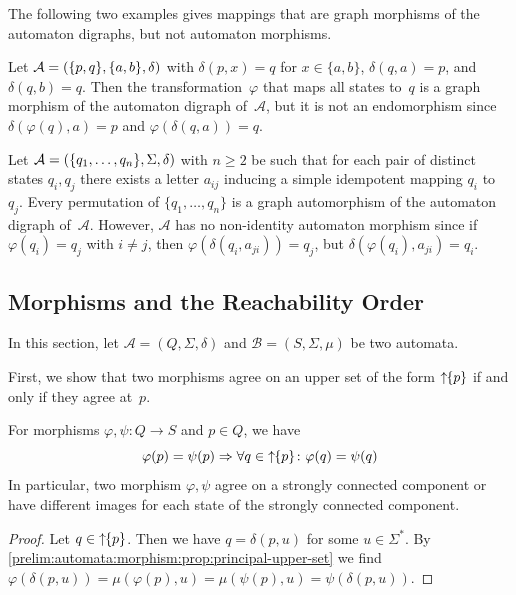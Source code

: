 The following two examples gives mappings that are graph morphisms of the automaton digraphs,
but not automaton morphisms.

\begin{example}
Let $\mathcal A = (\{p,q\}, \{a,b\}, \delta)$
with $\delta(p, x) = q$ for $x \in \{a,b\}$, $\delta(q, a) = p$, and $\delta(q, b) = q$.
Then the transformation~$\varphi$ that maps all states to~$q$
is a graph morphism of the automaton digraph of~$\mathcal A$,
but it is not an endomorphism
since $\delta(\varphi(q), a) = p$ and $\varphi(\delta(q, a)) = q$.
\end{example}

\begin{example}
Let $\mathcal A = (\{q_1,\ldots, q_n\}, \Sigma, \delta)$ with $n \ge 2$
be such that for each pair of distinct states $q_i, q_j$ there exists 
a letter $a_{ij}$ inducing a simple idempotent mapping $q_i$ to~$q_j$.
Every permutation of $\{q_1, \ldots, q_n\}$
is a graph automorphism of the automaton digraph of~$\mathcal A$.
However, $\mathcal A$ has no non-identity
automaton morphism
since if $\varphi(q_i) = q_j$ with $i \ne j$,
then $\varphi(\delta(q_i, a_{ji})) = q_j$,
but $\delta(\varphi(q_i), a_{ji}) = q_i$.
\end{example}



\subsection{Morphisms and the Reachability Order}

In this section, let $\mathcal A = (Q, \Sigma, \delta)$ and $\mathcal B = (S, \Sigma, \mu)$
be two automata.

First, we show that two morphisms agree on an upper set of the form $\mbox{\ensuremath{\displaystyle \uparrow \!\!\{p\}}}$
if and only if they agree at~$p$.

\begin{proposition} \label{prelim:automata:morphism:cor:two-morp-upper-set}
For morphisms $\varphi, \psi \colon Q \to S$ and $p \in Q$, we have
  \begin{equation}
	\varphi(p) = \psi(p) \Rightarrow \forall q \in \mbox{\ensuremath{\displaystyle \uparrow \!\!\{p\}}} \colon \varphi(q) = \psi(q) \label{prelim:eqn:two-morph-equal} 
  \end{equation}
 In particular, two morphism $\varphi, \psi$ agree on a strongly connected component
 or have different images for each state of the strongly connected component.
\end{proposition}
\begin{proof}
	Let $q \in \mbox{\ensuremath{\displaystyle \uparrow \!\!\{p\}}}$.
	Then we have $q = \delta(p, u)$ for some $u \in \Sigma^*$.
	By \cref{prelim:automata:morphism:prop:principal-upper-set}
	we find $\varphi(\delta(p, u)) = \mu(\varphi(p), u) =  \mu(\psi(p), u) = \psi(\delta(p, u))$.
\end{proof}

